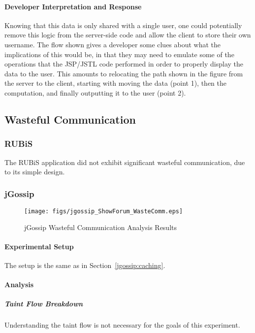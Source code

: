 \documentclass[msc,oneside]{ubcthesis}
\begin{document}
\paragraph{Developer Interpretation and Response}
Knowing that this data is only shared with a single user, one could potentially remove this logic from the server-side code and allow the client to store their own username. The flow shown gives a developer some clues about what the implications of this would be, in that they may need to emulate some of the operations that the JSP/JSTL code performed in order to properly display the data to the user. This amounts to relocating the path shown in the figure from the server to the client, starting with moving the data (point 1), then the computation, and finally outputting it to the user (point 2).

\subsection{Wasteful Communication}
\subsubsection{RUBiS}

The RUBiS application did not exhibit significant wasteful communication, due to its simple design.

\subsubsection{jGossip} 

\begin{sidewaysfigure}
\centering
\scalebox{0.2}
{\texttt{[image: figs/jgossip\_ShowForum\_WasteComm.eps]}}
\caption{jGossip Wasteful Communication Analysis Results} 
\label{fig:showforumcomm}
\end{sidewaysfigure}

\paragraph{Experimental Setup}
The setup is the same as in Section~\ref{jgossip:caching}.

\paragraph{Analysis}
\subparagraph{Taint Flow Breakdown}
Understanding the taint flow is not necessary for the goals of this experiment.
\end{document}
